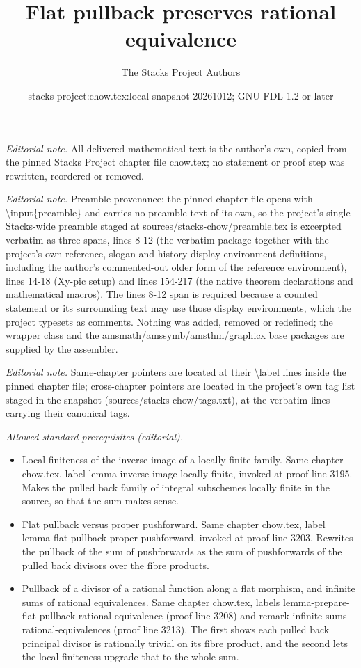 \documentclass[10pt,a4paper]{amsart}
\title{Flat pullback preserves rational equivalence}
\author{The Stacks Project Authors}
\date{stacks-project:chow.tex:local-snapshot-20261012; GNU FDL 1.2 or later}
\theoremstyle{plain}
\theoremstyle{definition}
\theoremstyle{remark}
\numberwithin{equation}{subsection}
\begin{document}
\maketitle
\noindent\textit{Editorial note.} All delivered mathematical text is the author's own, copied from the pinned Stacks Project chapter file chow.tex; no statement or proof step was rewritten, reordered or removed.\par\medskip
\noindent\textit{Editorial note.} Preamble provenance: the pinned chapter file opens with \textbackslash{}input\{preamble\} and carries no preamble text of its own, so the project's single Stacks-wide preamble staged at sources/stacks-chow/preamble.tex is excerpted verbatim as three spans, lines 8-12 (the verbatim package together with the project's own reference, slogan and history display-environment definitions, including the author's commented-out older form of the reference environment), lines 14-18 (Xy-pic setup) and lines 154-217 (the native theorem declarations and mathematical macros). The lines 8-12 span is required because a counted statement or its surrounding text may use those display environments, which the project typesets as comments. Nothing was added, removed or redefined; the wrapper class and the amsmath/amssymb/amsthm/graphicx base packages are supplied by the assembler.\par\medskip
\noindent\textit{Editorial note.} Same-chapter pointers are located at their \textbackslash{}label lines inside the pinned chapter file; cross-chapter pointers are located in the project's own tag list staged in the snapshot (sources/stacks-chow/tags.txt), at the verbatim lines carrying their canonical tags.\par\medskip
\noindent\textit{Allowed standard prerequisites (editorial).}\begin{itemize}
\item Local finiteness of the inverse image of a locally finite family. Same chapter chow.tex, label lemma-inverse-image-locally-finite, invoked at proof line 3195. Makes the pulled back family of integral subschemes locally finite in the source, so that the sum makes sense.
\item Flat pullback versus proper pushforward. Same chapter chow.tex, label lemma-flat-pullback-proper-pushforward, invoked at proof line 3203. Rewrites the pullback of the sum of pushforwards as the sum of pushforwards of the pulled back divisors over the fibre products.
\item Pullback of a divisor of a rational function along a flat morphism, and infinite sums of rational equivalences. Same chapter chow.tex, labels lemma-prepare-flat-pullback-rational-equivalence (proof line 3208) and remark-infinite-sums-rational-equivalences (proof line 3213). The first shows each pulled back principal divisor is rationally trivial on its fibre product, and the second lets the local finiteness upgrade that to the whole sum.
\end{itemize}\medskip
\end{document}

